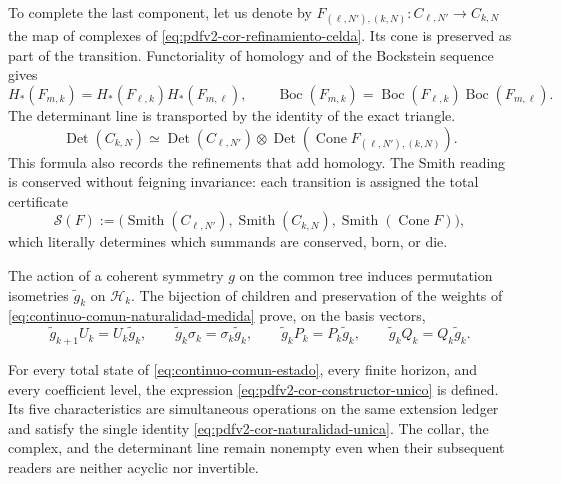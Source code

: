 To complete the last component, let us denote by
\(F_{(\ell,N'),(k,N)}:C_{\ell,N'}\to C_{k,N}\) the map of complexes of
\eqref{eq:pdfv2-cor-refinamiento-celda}. Its cone is preserved as part of the
transition. Functoriality of homology and of the Bockstein sequence gives
\begin{equation}
\label{eq:pdfv2-cor-naturalidad-homologia-bockstein}
 H_*(F_{m,k})=H_*(F_{\ell,k})H_*(F_{m,\ell}),
 \qquad
 \operatorname{Boc}(F_{m,k})
 =\operatorname{Boc}(F_{\ell,k})
  \operatorname{Boc}(F_{m,\ell}).
\end{equation}
The determinant line is transported by the identity of the exact triangle.
\begin{equation}
\label{eq:pdfv2-cor-naturalidad-determinante}
 \operatorname{Det}(C_{k,N})
 \simeq
 \operatorname{Det}(C_{\ell,N'})\otimes
 \operatorname{Det}\!\left(\operatorname{Cone}
 F_{(\ell,N'),(k,N)}\right).
\end{equation}
This formula also records the refinements that add homology. The
Smith reading is conserved without feigning invariance: each transition is
assigned the total certificate
\begin{equation}
\label{eq:pdfv2-cor-transicion-smith}
 \mathcal S(F):=
 \bigl(\operatorname{Smith}(C_{\ell,N'}),
       \operatorname{Smith}(C_{k,N}),
       \operatorname{Smith}(\operatorname{Cone}F)\bigr),
\end{equation}
which literally determines which summands are conserved, born, or die.

The action of a coherent symmetry \(g\) on the common tree induces
permutation isometries \(\widetilde g_k\) on
\(\mathscr H_k\). The bijection of children and preservation of the weights of
\eqref{eq:continuo-comun-naturalidad-medida} prove, on the basis vectors,
\begin{equation}
\label{eq:pdfv2-cor-naturalidad-transporte-hojas}
 \widetilde g_{k+1}U_k=U_k\widetilde g_k,
 \qquad
 \widetilde g_k\sigma_k=\sigma_k\widetilde g_k,
 \qquad
 \widetilde g_kP_k=P_k\widetilde g_k,
 \qquad
 \widetilde g_kQ_k=Q_k\widetilde g_k.
\end{equation}

\begin{theorem}
\label{thm:pdfv2-cor-totalidad-naturalidad}
For every total state of \eqref{eq:continuo-comun-estado}, every finite horizon,
and every coefficient level, the expression
\eqref{eq:pdfv2-cor-constructor-unico} is defined. Its five
characteristics are simultaneous operations on the same extension ledger and
satisfy the single identity \eqref{eq:pdfv2-cor-naturalidad-unica}. The collar, the complex, and the determinant
line remain nonempty even when their subsequent readers are neither acyclic nor
invertible.
\end{theorem}

